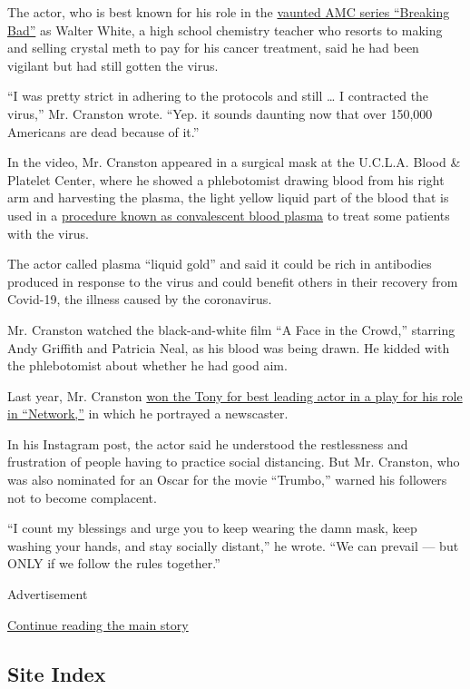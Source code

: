 The actor, who is best known for his role in the
\href{https://www.nytimes.com/2011/07/10/magazine/the-dark-art-of-breaking-bad.html}{vaunted
AMC series ``Breaking Bad''} as Walter White, a high school chemistry
teacher who resorts to making and selling crystal meth to pay for his
cancer treatment, said he had been vigilant but had still gotten the
virus.

``I was pretty strict in adhering to the protocols and still \ldots{} I
contracted the virus,'' Mr. Cranston wrote. ``Yep. it sounds daunting
now that over 150,000 Americans are dead because of it.''

In the video, Mr. Cranston appeared in a surgical mask at the U.C.L.A.
Blood \& Platelet Center, where he showed a phlebotomist drawing blood
from his right arm and harvesting the plasma, the light yellow liquid
part of the blood that is used in a
\href{https://www.nytimes.com/2020/04/24/smarter-living/coronavirus-convalescent-plasma-antibodies.html}{procedure
known as convalescent blood plasma} to treat some patients with the
virus.

The actor called plasma ``liquid gold'' and said it could be rich in
antibodies produced in response to the virus and could benefit others in
their recovery from Covid-19, the illness caused by the coronavirus.

Mr. Cranston watched the black-and-white film ``A Face in the Crowd,''
starring Andy Griffith and Patricia Neal, as his blood was being drawn.
He kidded with the phlebotomist about whether he had good aim.

Last year, Mr. Cranston
\href{https://www.nytimes.com/2019/06/09/theater/bryan-cranston-tony-awards.html}{won
the Tony for best leading actor in a play for his role in ``Network,''}
in which he portrayed a newscaster.

In his Instagram post, the actor said he understood the restlessness and
frustration of people having to practice social distancing. But Mr.
Cranston, who was also nominated for an Oscar for the movie ``Trumbo,''
warned his followers not to become complacent.

``I count my blessings and urge you to keep wearing the damn mask, keep
washing your hands, and stay socially distant,'' he wrote. ``We can
prevail --- but ONLY if we follow the rules together.''

Advertisement

\protect\hyperlink{after-bottom}{Continue reading the main story}

\hypertarget{site-index}{%
\subsection{Site Index}\label{site-index}}

